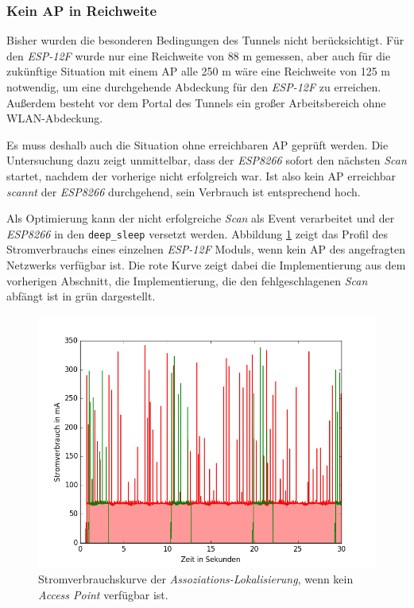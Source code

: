 \subsubsection{Kein AP in Reichweite}
Bisher wurden die besonderen Bedingungen des Tunnels nicht berücksichtigt.
Für den \emph{ESP-12F} wurde nur eine Reichweite von 88 m gemessen, aber auch für die zukünftige Situation mit einem AP alle 250 m wäre eine Reichweite von 125 m notwendig, um eine durchgehende Abdeckung für den \emph{ESP-12F} zu erreichen.
Außerdem besteht vor dem Portal des Tunnels ein großer Arbeitsbereich ohne WLAN-Abdeckung.

Es muss deshalb auch die Situation ohne erreichbaren AP geprüft werden.
Die Untersuchung dazu zeigt unmittelbar, dass der \emph{ESP8266} sofort den nächsten \emph{Scan} startet, nachdem der vorherige nicht erfolgreich war.
Ist also kein AP erreichbar \emph{scannt} der \emph{ESP8266} durchgehend, sein Verbrauch ist entsprechend hoch.

Als Optimierung kann der nicht erfolgreiche \emph{Scan} als Event verarbeitet und der \emph{ESP8266} in den \texttt{deep\_sleep} versetzt werden.
Abbildung \ref{fig:noap} zeigt das Profil des Stromverbrauchs eines einzelnen \emph{ESP-12F} Moduls, wenn kein AP des angefragten Netzwerks verfügbar ist.
Die rote Kurve zeigt dabei die Implementierung aus dem vorherigen Abschnitt, die Implementierung, die den fehlgeschlagenen \emph{Scan} abfängt ist in grün dargestellt.

\begin{figure}[h!]
  \centering
	\includegraphics[width=\textwidth]{plots/noap.png}
  \caption{Stromverbrauchskurve der \emph{Assoziations-Lokalisierung}, wenn kein \emph{Access Point} verfügbar ist.}
  \label{fig:noap}
\end{figure}


